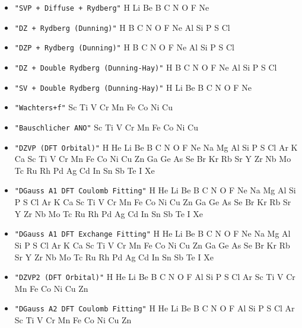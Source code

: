 \begin{itemize}
\item \verb#"SVP + Diffuse + Rydberg"# \newline
 H Li Be B C N O F Ne

\item \verb#"DZ + Rydberg (Dunning)"# \newline
 H B C N O F Ne Al Si P S Cl

\item \verb#"DZP + Rydberg (Dunning)"# \newline
 H B C N O F Ne Al Si P S Cl

\item \verb#"DZ + Double Rydberg (Dunning-Hay)"# \newline
 H B C N O F Ne Al Si P S Cl

\item \verb#"SV + Double Rydberg (Dunning-Hay)"# \newline
 H Li Be B C N O F Ne

\item \verb#"Wachters+f"# \newline
 Sc Ti V Cr Mn Fe Co Ni Cu

\item \verb#"Bauschlicher ANO"# \newline
 Sc Ti V Cr Mn Fe Co Ni Cu

\item \verb#"DZVP (DFT Orbital)"# \newline
 H He Li Be B C N O F Ne Na Mg Al Si P S Cl Ar K Ca Sc Ti V Cr Mn Fe Co
 Ni Cu Zn Ga Ge As Se Br Kr Rb Sr Y Zr Nb Mo Tc Ru Rh Pd Ag Cd In Sn Sb
 Te I Xe

\item \verb#"DGauss A1 DFT Coulomb Fitting"# \newline
 H He Li Be B C N O F Ne Na Mg Al Si P S Cl Ar K Ca Sc Ti V Cr Mn Fe Co
 Ni Cu Zn Ga Ge As Se Br Kr Rb Sr Y Zr Nb Mo Tc Ru Rh Pd Ag Cd In Sn Sb
 Te I Xe

\item \verb#"DGauss A1 DFT Exchange Fitting"# \newline
 H He Li Be B C N O F Ne Na Mg Al Si P S Cl Ar K Ca Sc Ti V Cr Mn Fe Co
 Ni Cu Zn Ga Ge As Se Br Kr Rb Sr Y Zr Nb Mo Tc Ru Rh Pd Ag Cd In Sn Sb
 Te I Xe

\item \verb#"DZVP2 (DFT Orbital)"# \newline
 H He Li Be B C N O F Al Si P S Cl Ar Sc Ti V Cr Mn Fe Co Ni Cu Zn

\item \verb#"DGauss A2 DFT Coulomb Fitting"# \newline
 H He Li Be B C N O F Al Si P S Cl Ar Sc Ti V Cr Mn Fe Co Ni Cu Zn


\end{itemize}
